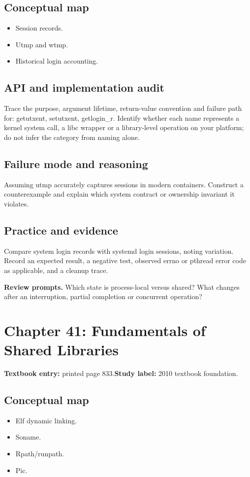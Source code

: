 \documentclass[11pt,letterpaper,oneside]{report}
\begin{document}
\subsection{Conceptual map}
\begin{itemize}
\item Session records.
\item Utmp and wtmp.
\item Historical login accounting.
\end{itemize}
\subsection{API and implementation audit}
Trace the purpose, argument lifetime, return-value convention and failure path for: getutxent, setutxent, getlogin\_r. Identify whether each name represents a kernel system call, a libc wrapper or a library-level operation on your platform; do not infer the category from naming alone.

\subsection{Failure mode and reasoning}
Assuming utmp accurately captures sessions in modern containers. Construct a counterexample and explain which system contract or ownership invariant it violates.

\subsection{Practice and evidence}
Compare system login records with systemd login sessions, noting variation. Record an expected result, a negative test, observed errno or pthread error code as applicable, and a cleanup trace.

\textbf{Review prompts.} Which state is process-local versus shared? What changes after an interruption, partial completion or concurrent operation?

\section{Chapter 41: Fundamentals of Shared Libraries}
\textbf{Textbook entry:} printed page 833.\quad \textbf{Study label:} 2010 textbook foundation.

\subsection{Conceptual map}
\begin{itemize}
\item Elf dynamic linking.
\item Soname.
\item Rpath/runpath.
\item Pic.
\end{itemize}
\end{document}
